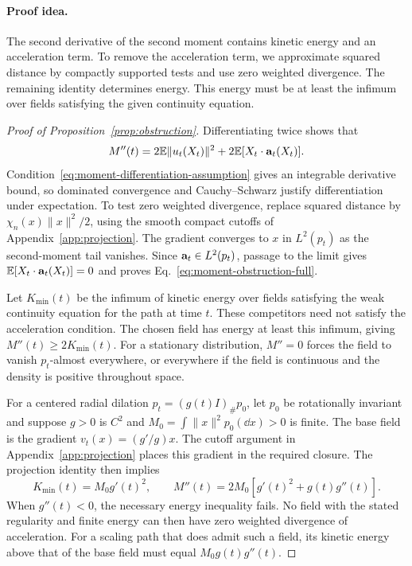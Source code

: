 \paragraph{Proof idea.}
The second derivative of the second moment contains kinetic energy and an acceleration term. To remove the acceleration term, we approximate squared distance by compactly supported tests and use zero weighted divergence. The remaining identity determines energy. This energy must be at least the infimum over fields satisfying the given continuity equation.

\begin{proof}[Proof of Proposition~\ref{prop:obstruction}]
Differentiating twice shows that
\[
 M''(t)=2\mathbb E\|u_t(X_t)\|^2+2\mathbb E[X_t\cdot\mathbf a_t(X_t)].
\]
Condition~\eqref{eq:moment-differentiation-assumption} gives an integrable derivative bound, so dominated convergence and Cauchy--Schwarz justify differentiation under expectation. To test zero weighted divergence, replace squared distance by $\chi_n(x)\|x\|^2/2$, using the smooth compact cutoffs of Appendix~\ref{app:projection}. The gradient converges to $x$ in $L^2(p_t)$ as the second-moment tail vanishes. Since $\mathbf a_t\in L^2(p_t)$, passage to the limit gives $\mathbb E[X_t\cdot\mathbf a_t(X_t)]=0$ and proves Eq.~\eqref{eq:moment-obstruction-full}.

Let $K_{\min}(t)$ be the infimum of kinetic energy over fields satisfying the weak continuity equation for the path at time $t$. These competitors need not satisfy the acceleration condition. The chosen field has energy at least this infimum, giving $M''(t)\ge2K_{\min}(t)$. For a stationary distribution, $M''=0$ forces the field to vanish $p_t$-almost everywhere, or everywhere if the field is continuous and the density is positive throughout space.

For a centered radial dilation $p_t=(g(t)I)_\#p_0$, let $p_0$ be rotationally invariant and suppose $g>0$ is $C^2$ and $M_0=\int\|x\|^2p_0(\dd x)>0$ is finite. The base field is the gradient $v_t(x)=(g'/g)x$. The cutoff argument in Appendix~\ref{app:projection} places this gradient in the required closure. The projection identity then implies
\[
 K_{\min}(t)=M_0g'(t)^2,\qquad
 M''(t)=2M_0[g'(t)^2+g(t)g''(t)].
\]
When $g''(t)<0$, the necessary energy inequality fails. No field with the stated regularity and finite energy can then have zero weighted divergence of acceleration. For a scaling path that does admit such a field, its kinetic energy above that of the base field must equal $M_0g(t)g''(t)$.
\end{proof}

